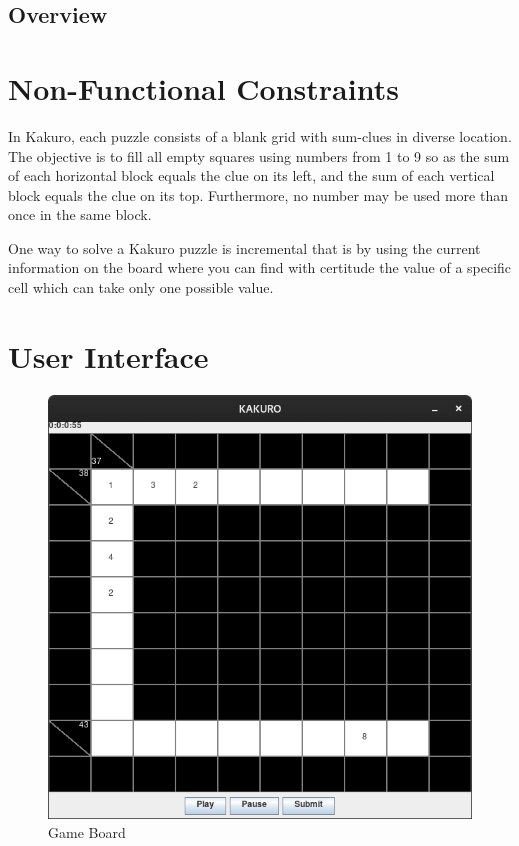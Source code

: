 \documentclass[12pt]{article}
\begin{document}
\newpage

\subsection{Overview}

\section{Non-Functional Constraints}

In Kakuro, each puzzle consists of a blank grid with sum-clues in diverse location. The objective is to fill all empty squares using numbers from 1 to 9 so as the sum of each horizontal block equals the clue on its left, and the sum of each vertical block equals the clue on its top. Furthermore, no number may be used more than once in the same block.

One way to solve a Kakuro puzzle is incremental that is by using the current information on the board where you can find with certitude the value of a specific cell which can take only one possible value.

\section{User Interface}
\begin{figure}[htbp]
    \centering
    \includegraphics[scale=0.4]{images/UI1.png}
    \caption{Game Board}
    \label{fig:Game Board}
\end{figure}
\end{document}
